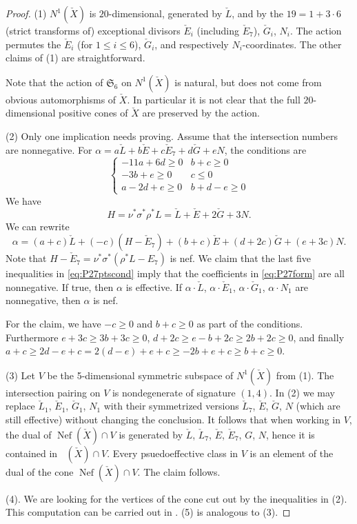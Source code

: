 \documentclass[12pt]{amsart}
\theoremstyle{definition}
\renewcommand{\geq}{\geqslant}
\renewcommand{\leq}{\leqslant}
\DeclareMathOperator{\Nef}{Nef}
\DeclareMathOperator{\Eff}{\overline{Eff}}
\newcommand{\?}{ \circled{{\large\bf ?}}}
\let\frak\mathfrak
\begin{document}
\begin{proof} 
(1) $N^1(\check X)$ is $20$-dimensional, generated by $\check L$, and by the $19=1+3\cdot 6$ (strict transforms of) exceptional divisors $\check E_i$ (including $\check E_7$), $\check G_i$, $N_i$. The action permutes the $\check E_i$ (for $1\leq i\leq 6$), $\check G_i$, and respectively $N_i$-coordinates. The other claims of (1) are straightforward. 

Note that the action of $\frak S_6$ on $N^1(\check X)$ is natural, but does not come from obvious automorphisms of $\check X$. In particular it is not clear that the full $20$-dimensional positive cones of $\check X$ are preserved by the action. 

(2)	Only one implication needs proving. Assume that the intersection numbers are nonnegative. For $\alpha=a\check L+b\check E+c\check E_7+d\check G+eN$, the conditions are
\begin{equation}\label{eq:P27ptscond}
\begin{cases}
-11a+6d\geq 0 & b+c\geq 0\\
-3b+e\geq 0 & c\leq 0\\
a-2d+e\geq 0 & b+d-e\geq 0
	\end{cases}
\end{equation} 
We have
\[H=\nu^*\sigma^*\rho^*L=\check L+\check E+2\check G+3N.\]
We can rewrite
\begin{equation}\label{eq:P27form}\alpha=(a+c)\check L+(-c)(H-\check E_7)+(b+c)\check E+(d+2c)\check G+(e+3c)N.
\end{equation}
Note that $H-\check E_7=\nu^*\sigma^*(\rho^*L-E_7)$ is nef.
We claim that the last five inequalities in \eqref{eq:P27ptscond} imply that the coefficients in \eqref{eq:P27form} are all nonnegative. If true, then $\alpha$ is effective. If  $\alpha\cdot\check L$, $\alpha\cdot\check E_1$, $\alpha\cdot\check G_1$, $\alpha\cdot N_1$ are nonnegative, then $\alpha$ is nef.

For the claim, we have $-c\geq 0$ and $b+c\geq 0$ as part of the conditions. Furthermore $e+3c\geq3b+3c\geq 0$, $d+2c\geq e-b+2c\geq 2b+2c\geq 0$, and finally $a+c\geq 2d-e+c=2(d-e)+e+c\geq -2b+e+c\geq b+c\geq 0$.

(3) Let $V$ be the 5-dimensional symmetric subspace of $N^1(\check X)$ from (1). The intersection pairing on $V$ is nondegenerate of signature $(1,4)$.
In (2) we may replace $\check L_1$, $\check E_1$, $\check G_1$, $N_1$ with their symmetrized versions $\check L_7$, $\check E$, $\check G$, $N$ (which are still effective) without changing the conclusion. It follows that when working in $V$, the dual of $\Nef(\check X)\cap V$ is generated by $\check L$, $\check L_7$, $\check E$, $\check E_7$, $G$, $N$, hence it is contained in $\Eff(\check X)\cap V$. Every psuedoeffective class in $V$ is an element of the dual of the cone $\Nef(\check X)\cap V$. The claim follows.

(4). We are looking for the vertices of the cone cut out by the inequalities in (2). This computation can be carried out in \cite{Polymake}. (5) is analogous to (3).
\end{proof}
\end{document}
